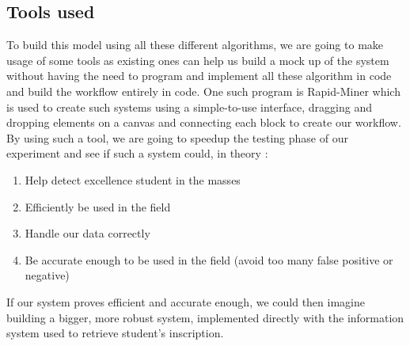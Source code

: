 \documentclass[../main.tex]{subfiles}
\begin{document}
\subsection{Tools used}
\label{subsec:conimp_tools}
To build this model using all these different algorithms, we are going to make usage of some tools as existing ones can help us build a mock up of the system without having the need to program and implement all these algorithm in code and build the workflow entirely in code. One such program is Rapid-Miner which is used to create such systems using a simple-to-use interface, dragging and dropping elements on a canvas and connecting each block to create our workflow. 
By using such a tool, we are going to speedup the testing phase of our experiment and see if such a system could, in theory :
\begin{enumerate}
    \item Help detect excellence student in the masses
    \item Efficiently be used in the field
    \item Handle our data correctly
    \item Be accurate enough to be used in the field (avoid too many false positive or negative)
\end{enumerate}
If our system proves efficient and accurate enough, we could then imagine building a bigger, more robust system, implemented directly with the information system used to retrieve student's inscription.
\end{document}
